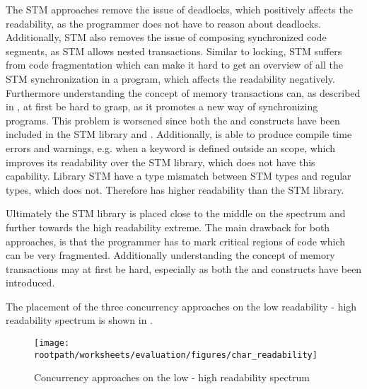 The \ac{STM} approaches remove the issue of deadlocks, which positively affects the readability, as the programmer does not have to reason about deadlocks. Additionally, \ac{STM} also removes the issue of composing synchronized code segments, as \ac{STM} allows nested transactions. Similar to locking, \ac{STM} suffers from code fragmentation which can make it hard to get an overview of all the \ac{STM} synchronization in a program, which affects the readability negatively. Furthermore understanding the concept of memory transactions can, as described in \cite{rossbach2010transactional}, at first be hard to grasp, as it promotes a new way of synchronizing programs. This problem is worsened since both the  and  constructs have been included in the \ac{STM} library and \stmname. Additionally, \stmname is able to produce compile time errors and warnings, e.g. when a  keyword is defined outside an  scope, which improves its readability over the \ac{STM} library, which does not have this capability. Library \ac{STM} have a type mismatch between \ac{STM} types and regular types, which \stmname does not. Therefore \stmname has higher readability than the \ac{STM} library.

Ultimately the \ac{STM} library is placed close to the middle on the spectrum and \stmname further towards the high readability extreme. The main drawback for both approaches, is that the programmer has to mark critical regions of code which can be very fragmented. Additionally understanding the concept of memory transactions may at first be hard, especially as both the  and  constructs have been introduced.

The placement of the three concurrency approaches on the low readability - high readability spectrum is shown in .

\begin{figure}[htbp]
\centering
\texttt{[image: \\rootpath/worksheets/evaluation/figures/char\_readability]}
\caption{Concurrency approaches on the low - high readability spectrum}
\label{fig:char_readability}
\end{figure}

